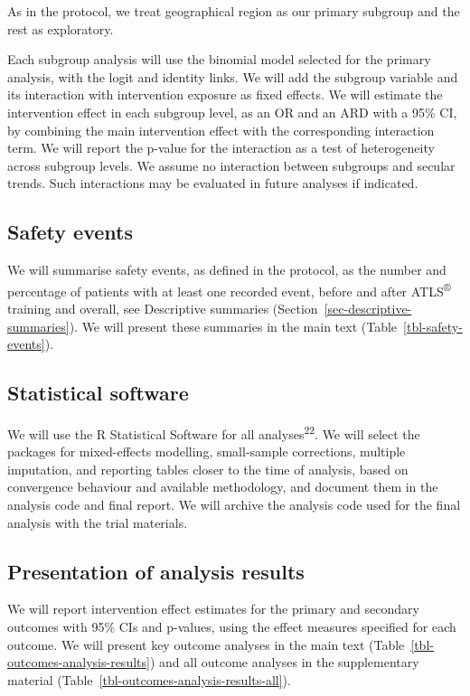 \documentclass[
]{scrartcl}
\begin{document}
As in the protocol, we treat geographical region as our primary subgroup
and the rest as exploratory.

Each subgroup analysis will use the binomial model selected for the
primary analysis, with the logit and identity links. We will add the
subgroup variable and its interaction with intervention exposure as
fixed effects. We will estimate the intervention effect in each subgroup
level, as an OR and an ARD with a 95\% CI, by combining the main
intervention effect with the corresponding interaction term. We will
report the p-value for the interaction as a test of heterogeneity across
subgroup levels. We assume no interaction between subgroups and secular
trends. Such interactions may be evaluated in future analyses if
indicated.

\subsection{Safety events}\label{sec-safety-events}

We will summarise safety events, as defined in the protocol, as the
number and percentage of patients with at least one recorded event,
before and after ATLS\textsuperscript{®} training and overall, see
Descriptive summaries (Section~\ref{sec-descriptive-summaries}). We will
present these summaries in the main text
(Table~\ref{tbl-safety-events}).

\subsection{Statistical software}\label{sec-statistical-software}

We will use the R Statistical Software for all
analyses\textsuperscript{22}. We will select the packages for
mixed-effects modelling, small-sample corrections, multiple imputation,
and reporting tables closer to the time of analysis, based on
convergence behaviour and available methodology, and document them in
the analysis code and final report. We will archive the analysis code
used for the final analysis with the trial materials.

\subsection{Presentation of analysis
results}\label{sec-presentation-of-analysis-results}

We will report intervention effect estimates for the primary and
secondary outcomes with 95\% CIs and p-values, using the effect measures
specified for each outcome. We will present key outcome analyses in the
main text (Table~\ref{tbl-outcomes-analysis-results}) and all outcome
analyses in the supplementary material
(Table~\ref{tbl-outcomes-analysis-results-all}).
\end{document}
